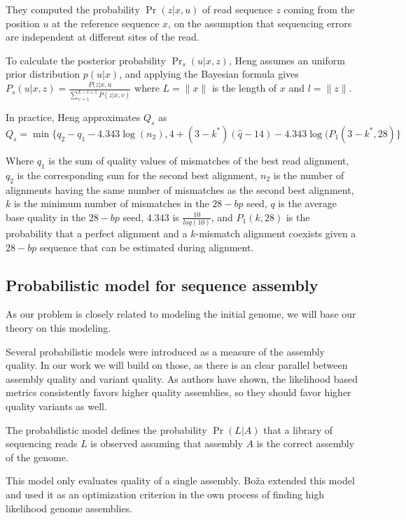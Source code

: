 They computed the probability $\Pr(z|x,u)$ of read sequence $z$ coming from the position $u$ at the reference sequence $x$, 
on the assumption that sequencing errors are independent at different sites of the read.

To calculate the posterior probability $\Pr_s(u|x,z)$, Heng assumes an uniform prior distribution $p(u|x)$, and applying the Bayesian formula gives 
$P_s(u|x,z)=\frac{P(z|x,u}{\sum_{v=1}^{L-l+1}P(z|x,v)}$ 
where $L = \|x\|$ is the length of $x$ and $l = \|z\|$. 

In practice, Heng approximates $Q_s$ as 
$$Q_s=\min\{q_2 - q_1 - 4.343 \log(n_2), 4+(3-k^*)(\hat{q} -14)-4.343 \log(P_1 (3-k^*, 28) \}$$

Where $q_1$ is the sum of quality values of mismatches of the best read alignment, $q_2$ is the corresponding sum for the second best alignment, 
$n_2$ is the number of alignments having the same number of mismatches as the second best alignment, 
$k$ is the minimum number of mismatches in the $28-bp$ seed, $q$ is the average base quality in the $28-bp$ seed, 
$4.343$ is $\frac{10}{log(10)}$, and $P_1(k,28)$ is the probability that a perfect alignment and a $k$-mismatch alignment coexists given a $28-bp$ sequence that can be estimated during alignment. 

\subsection{Probabilistic model for sequence assembly}

As our problem is closely related to modeling the initial genome, we will base our theory on this modeling.

Several probabilistic models were introduced\cite{rahman2013cgal}\cite{ghodsi2013novo} as a measure of the assembly quality. 
In our work we  will build on those, as there is an clear parallel between assembly quality and
variant quality.
As authors have shown, the likelihood based metrics consistently favors higher quality assemblies, so they should favor higher quality variants as well. 

The probabilistic model defines the probability $\Pr(L|A)$ that a library of sequencing reads $L$ is observed assuming that assembly $A$ is the correct assembly of the genome. 

This model only evaluates quality of a single assembly. 
Boža\cite{bovza2015gaml} extended this model and used it as an optimization criterion in the own process of finding high likelihood genome assemblies.

